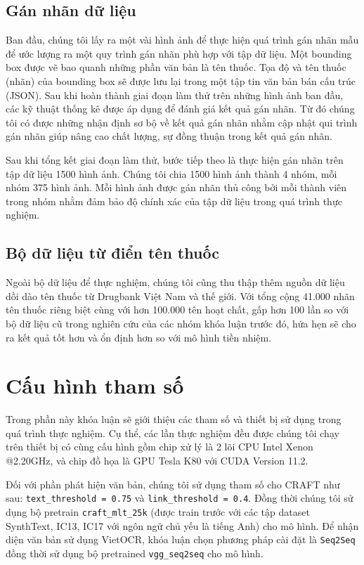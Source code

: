 \subsection{Gán nhãn dữ liệu}
Ban đầu, chúng tôi lấy ra một vài hình ảnh để thực hiện quá trình gán nhãn mẫu để ước
lượng ra một quy trình gán nhãn phù hợp với tập dữ liệu. Một bounding box được vẽ bao
quanh những phần văn bản là tên thuốc. Tọa độ và tên thuốc (nhãn) của bounding box sẽ
được lưu lại trong một tập tin văn bản bán cấu trúc (JSON). Sau khi hoàn thành giai đoạn
làm thử trên những hình ảnh ban đầu, các kỹ thuật thống kê được áp dụng để đánh giá kết
quả gán nhãn. Từ đó chúng tôi có được những nhận định sơ bộ về kết quả gán nhãn nhằm
cập nhật qui trình gán nhãn giúp nâng cao chất lượng, sự đồng thuận trong kết quả gán
nhãn.

Sau khi tổng kết giai đoạn làm thử, bước tiếp theo là thực hiện gán nhãn trên tập dữ liệu
1500 hình ảnh. Chúng tôi chia 1500 hình ảnh thành 4 nhóm, mỗi nhóm 375 hình ảnh. Mỗi
hình ảnh được gán nhãn thủ công bởi mỗi thành viên trong nhóm nhằm đảm bảo độ chính
xác của tập dữ liệu trong quá trình thực nghiệm.

\subsection{Bộ dữ liệu từ điển tên thuốc}
Ngoài bộ dữ liệu để thực nghiệm, chúng tôi cũng thu thập thêm nguồn dữ liệu dồi dào tên
thuốc từ Drugbank Việt Nam và thế giới. Với tổng cộng 41.000 nhãn tên thuốc riêng biệt
cùng với hơn 100.000 tên hoạt chất, gấp hơn 100 lần so với bộ dữ liệu cũ trong nghiên cứu của các nhóm khóa luận trước đó,  hứa hẹn sẽ cho ra kết quả tốt hơn và ổn định hơn so với mô hình tiền nhiệm.

\section{Cấu hình tham số}

Trong phần này khóa luận sẽ giới thiệu các tham số và thiết bị sử dụng trong quá trình thực nghiệm. Cụ thể, các lần thực nghiệm đều được chúng tôi chạy trên thiết bị có cùng cấu hình gồm chip xử lý là 2 lõi CPU Intel Xenon @2.20GHz, và chip đồ họa là GPU Tesla K80 với CUDA Version 11.2. 

Đối với phần phát hiện văn bản, chúng tôi sử dụng tham số cho CRAFT như sau: \verb|text_threshold = 0.75| và \verb|link_threshold = 0.4|. Đồng thời chúng tôi sử dụng bộ pretrain \verb|craft_mlt_25k| (được train trước với các tập dataset SynthText, IC13, IC17 với ngôn ngữ chủ yếu là tiếng Anh) cho mô hình. Để nhận diện văn bản sử dụng VietOCR, khóa luận chọn phương pháp cài đặt là \verb|Seq2Seq| đồng thời sử dụng bộ pretrained \verb|vgg_seq2seq| cho mô hình. 

